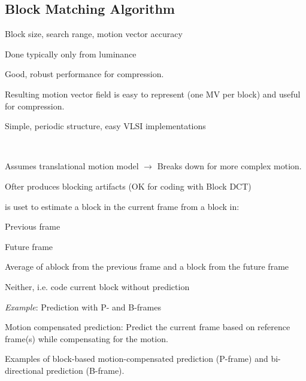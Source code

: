 \begin{compactdesc}
\section{Block Matching Algorithm}
\item[\lp{Issues}] Block size, search range, motion vector accuracy
\item[\lp{Estimate}] Done typically only from luminance
\item[\lp{Advantages}] 
	\begin{enumerate*}[label=\protect\circled{\arabic*},itemjoin=]
		\item Good, robust performance for compression. \\
		\item Resulting motion vector field is easy to represent (one MV per block) and useful for compression. \\
		\item Simple, periodic structure, easy VLSI implementations
	\end{enumerate*}
\item[\lp{Disadvantages}] \hfill\\
	\begin{enumerate*}[label=\protect\circled{\arabic*},itemjoin=]
		\item Assumes translational motion model $\to$ Breaks down for more complex motion.\\
		\item Ofter produces blocking artifacts (OK for coding with Block DCT)
	\end{enumerate*}
\item[\lp{Bidirectional MC prediction}]
	is uset to estimate a block in the current frame from a block in:
	\begin{enumerate*}[label=\protect\circled{\arabic*},itemjoin=]
		\item Previous frame\\
		\item Future frame\\
		\item Average of ablock from the previous frame and a block from the future frame\\
		\item Neither, i.e. code current block without prediction
	\end{enumerate*}
	\emph{Example}: Prediction with P- and B-frames\\
	\begin{enumerate*}[label=\protect\circled{\arabic*},itemjoin=]
		\item Motion compensated prediction: Predict the current frame based on reference frame(s) while compensating for the motion.\\
		\item Examples of block-based motion-compensated prediction (P-frame) and bi-directional prediction (B-frame).
	\end{enumerate*}

\end{compactdesc}
